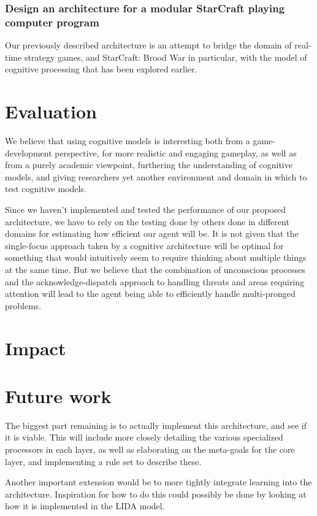 \subsubsection{Design an architecture for a modular StarCraft playing computer
program}
Our previously described architecture is an attempt to bridge the domain of
real-time strategy games, and StarCraft: Brood War in particular, with the
model of cognitive processing that has been explored earlier.


\section{Evaluation}
We believe that using cognitive models is interesting both from a
game-development perspective, for more realistic and engaging gameplay, as well
as from a purely academic viewpoint, furthering the understanding of cognitive
models, and giving researchers yet another environment and domain in which to
test cognitive models.

Since we haven't implemented and tested the performance of our proposed
architecture, we have to rely on the testing done by others done in different
domains for estimating how efficient our agent will be. It is not given that the
single-focus approach taken by a cognitive architecture will be optimal for
something that would intuitively seem to require thinking about multiple things
at the same time. But we believe that the combination of unconscious processes
and the acknowledge-dispatch approach to handling threats and areas requiring
attention will lead to the agent being able to efficiently handle multi-pronged
problems.

\section{Impact}


\section{Future work}
\label{sec:futurework}
The biggest part remaining is to actually implement this architecture, and see
if it is viable. This will include more closely detailing the various
specialized processors in each layer, as well as elaborating on the meta-goals
for the core layer, and implementing a rule set to describe these.

Another important extension would be to more tightly integrate learning into
the architecture. Inspiration for how to do this could possibly be done by
looking at how it is implemented in the LIDA model\cite{franklin2007lida}.